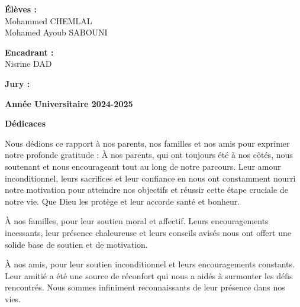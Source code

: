 \documentclass[a4paper,15pt]{report}
\begin{document}
	\hspace*{1.2cm}
	\begin{minipage}{0.4\textwidth}
		\textbf{Élèves :}\\
		Mohammed CHEMLAL\\
		Mohamed Ayoub SABOUNI
	\end{minipage}
	\hfill
	\begin{minipage}{0.4\textwidth}
		\textbf{Encadrant :}\\
		Nisrine DAD
	\end{minipage}
	\hspace*{1.2cm}
	
	\vspace{1cm}
		\begin{center}
	\hspace*{1.2cm}\textbf{Jury :}
	
	\vfill
		\end{center}
	\begin{center}
		\textbf{Année Universitaire 2024-2025}
	\end{center}
	
	\cleardoublepage
	\thispagestyle{empty}
	\begin{center}
		\vspace*{3cm}
		{\Large \textbf{Dédicaces}}
	\end{center}
	
	\vspace{1cm}
			\label{sec:dedi}
		Nous dédions ce rapport à nos parents, nos familles et nos amis pour exprimer notre profonde gratitude :
		\vspace{1cm}
		À nos parents, qui ont toujours été à nos côtés, nous soutenant et nous encourageant tout au long de notre parcours. Leur amour inconditionnel, leurs sacrifices et leur confiance en nous ont constamment nourri notre motivation pour atteindre nos objectifs et réussir cette étape cruciale de notre vie. Que Dieu les protège et leur accorde santé et bonheur.
		
		\vspace{0.8cm}
		À nos familles, pour leur soutien moral et affectif. Leurs encouragements incessants, leur présence chaleureuse et leurs conseils avisés nous ont offert une solide base de soutien et de motivation.
		
		\vspace{0.8cm}
		À nos amis, pour leur soutien inconditionnel et leurs encouragements constants. Leur amitié a été une source de réconfort qui nous a aidés à surmonter les défis rencontrés. Nous sommes infiniment reconnaissants de leur présence dans nos vies.
	
\end{document}
